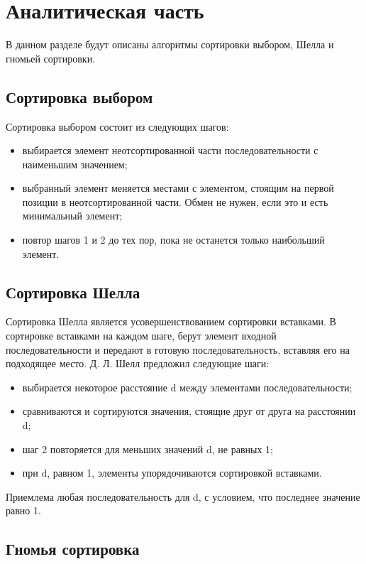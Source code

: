 \chapter{Аналитическая часть}

В данном разделе будут описаны алгоритмы сортировки выбором, Шелла и гномьей сортировки.

\section{Сортировка выбором}

Сортировка выбором\cite{virt} состоит из следующих шагов:

\begin{itemize}
	\item выбирается элемент неотсортированной части последовательности с наименьшим значением;
	\item выбранный элемент меняется местами с элементом, стоящим на первой позиции в неотсортированной части. Обмен не нужен, если это и есть минимальный элемент;
	\item повтор шагов 1 и 2 до тех пор, пока не останется только наибольший элемент.
\end{itemize}

\section{Сортировка Шелла}

Сортировка Шелла\cite{virt} является усовершенствованием сортировки вставками. В сортировке вставками на каждом шаге, берут элемент входной последовательности и передают в готовую последовательность, вставляя его на подходящее место. Д. Л. Шелл предложил следующие шаги:

\begin{itemize}
	\item выбирается некоторое расстояние d между элементами последовательности;
	\item сравниваются и сортируются значения, стоящие друг от друга на расстоянии d;
	\item шаг 2 повторяется для меньших значений d, не равных 1;
	\item при d, равном 1, элементы упорядочиваются сортировкой вставками.
\end{itemize}

Приемлема любая последовательность для d, с условием, что последнее значение равно 1.

\section{Гномья сортировка}

